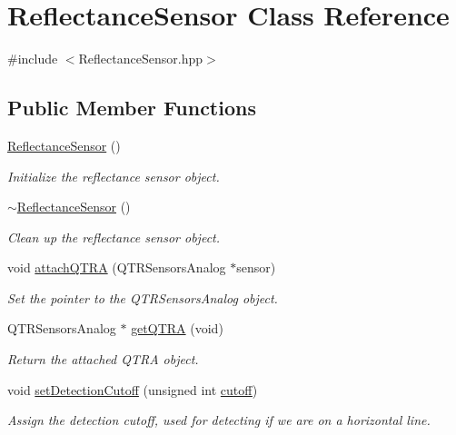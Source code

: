 \hypertarget{class_reflectance_sensor}{}\section{Reflectance\+Sensor Class Reference}
\label{class_reflectance_sensor}


{\ttfamily \#include $<$Reflectance\+Sensor.\+hpp$>$}

\subsection*{Public Member Functions}
\begin{DoxyCompactItemize}
\item 
\hyperlink{class_reflectance_sensor_a0460515b96ac26e3fcf0cfb74a6dd324}{Reflectance\+Sensor} ()
\begin{DoxyCompactList}\small\item\em Initialize the reflectance sensor object. \end{DoxyCompactList}\item 
\hyperlink{class_reflectance_sensor_a139165396ee1a7d67b3a1a83a62de85f}{$\sim$\+Reflectance\+Sensor} ()
\begin{DoxyCompactList}\small\item\em Clean up the reflectance sensor object. \end{DoxyCompactList}\item 
void \hyperlink{class_reflectance_sensor_a09c734de7ea4c4f3e7279d1d4c020b5d}{attach\+Q\+T\+RA} (Q\+T\+R\+Sensors\+Analog $\ast$sensor)
\begin{DoxyCompactList}\small\item\em Set the pointer to the Q\+T\+R\+Sensors\+Analog object. \end{DoxyCompactList}\item 
Q\+T\+R\+Sensors\+Analog $\ast$ \hyperlink{class_reflectance_sensor_a57665677450add1160b8fadb3699b3f6}{get\+Q\+T\+RA} (void)
\begin{DoxyCompactList}\small\item\em Return the attached Q\+T\+RA object. \end{DoxyCompactList}\item 
void \hyperlink{class_reflectance_sensor_a49851d00301cadc84ac53e747e49971b}{set\+Detection\+Cutoff} (unsigned int \hyperlink{class_reflectance_sensor_ab690b7c2e5b1ba69c0068841fe916dbd}{cutoff})
\begin{DoxyCompactList}\small\item\em Assign the detection cutoff, used for detecting if we are on a horizontal line. \end{DoxyCompactList}\item 

\end{DoxyCompactItemize}
